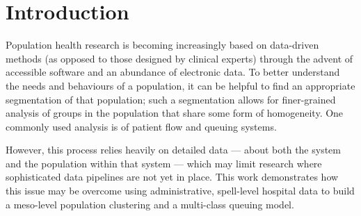 \section{Introduction}\label{sec:intro}

Population health research is becoming increasingly based on data-driven methods
(as opposed to those designed by clinical experts) through the advent of
accessible software and an abundance of electronic data. To better understand
the needs and behaviours of a population, it can be helpful to find an
appropriate segmentation of that population; such a segmentation allows for
finer-grained analysis of groups in the population that share some form of
homogeneity. One commonly used analysis is of patient flow and queuing systems.

However, this process relies heavily on detailed data --- about both the system
and the population within that system --- which may limit research where
sophisticated data pipelines are not yet in place. This work demonstrates how
this issue may be overcome using administrative, spell-level hospital data to
build a meso-level population clustering and a multi-class queuing model. 



